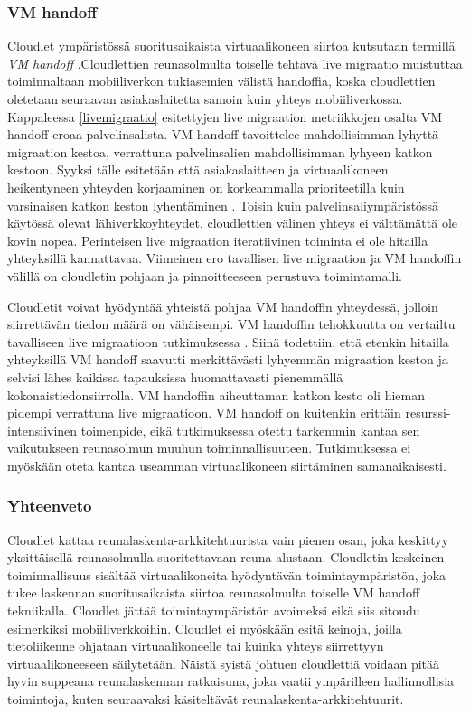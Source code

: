 \subsubsection*{VM handoff} \label{vmhandoff}

Cloudlet ympäristössä suoritusaikaista virtuaalikoneen siirtoa kutsutaan termillä \textit{VM handoff} \cite{ha2015adaptive}.Cloudlettien reunasolmulta toiselle tehtävä live migraatio muistuttaa toiminnaltaan mobiiliverkon tukiasemien välistä handoffia, koska cloudlettien oletetaan seuraavan asiakaslaitetta samoin kuin yhteys mobiiliverkossa.
Kappaleessa \ref{livemigraatio} esitettyjen live migraation metriikkojen osalta VM handoff eroaa palvelinsalista. VM handoff tavoittelee mahdollisimman lyhyttä migraation kestoa, verrattuna palvelinsalien mahdollisimman lyhyeen katkon kestoon.
Syyksi tälle esitetään että asiakaslaitteen ja virtuaalikoneen heikentyneen yhteyden korjaaminen on korkeammalla prioriteetilla kuin varsinaisen katkon keston lyhentäminen \cite{ha2015adaptive}.
Toisin kuin palvelinsaliympäristössä käytössä olevat lähiverkkoyhteydet, cloudlettien välinen yhteys ei välttämättä ole kovin nopea. 
Perinteisen live migraation iteratiivinen toiminta ei ole hitailla yhteyksillä kannattavaa. 
Viimeinen ero tavallisen live migraation ja VM handoffin välillä on cloudletin pohjaan ja pinnoitteeseen perustuva toimintamalli.

Cloudletit voivat hyödyntää yhteistä pohjaa VM handoffin yhteydessä, jolloin siirrettävän tiedon määrä on vähäisempi. 
VM handoffin tehokkuutta on vertailtu tavalliseen live migraatioon tutkimuksessa \cite{ha2017you}. Siinä todettiin, että etenkin hitailla yhteyksillä VM handoff saavutti merkittävästi lyhyemmän migraation keston ja selvisi lähes kaikissa tapauksissa huomattavasti pienemmällä kokonaistiedonsiirrolla. VM handoffin aiheuttaman katkon kesto oli hieman pidempi verrattuna live migraatioon. 
VM handoff on kuitenkin erittäin resurssi-intensiivinen toimenpide, eikä tutkimuksessa otettu tarkemmin kantaa sen vaikutukseen reunasolmun muuhun toiminnallisuuteen. 
Tutkimuksessa ei myöskään oteta kantaa useamman virtuaalikoneen siirtäminen samanaikaisesti. 
\subsubsection*{Yhteenveto}
Cloudlet kattaa reunalaskenta-arkkitehtuurista vain pienen osan, joka keskittyy yksittäisellä reunasolmulla suoritettavaan reuna-alustaan. Cloudletin keskeinen toiminnallisuus sisältää virtuaalikoneita hyödyntävän toimintaympäristön, joka tukee laskennan suoritusaikaista siirtoa reunasolmulta toiselle VM handoff tekniikalla. 
Cloudlet jättää toimintaympäristön avoimeksi eikä siis sitoudu esimerkiksi mobiiliverkkoihin.
Cloudlet ei myöskään esitä keinoja, joilla tietoliikenne ohjataan virtuaalikoneelle tai kuinka yhteys siirrettyyn virtuaalikoneeseen säilytetään. 
Näistä syistä johtuen cloudlettiä voidaan pitää hyvin suppeana reunalaskennan ratkaisuna, joka vaatii ympärilleen hallinnollisia toimintoja, kuten seuraavaksi käsiteltävät reunalaskenta-arkkitehtuurit.
